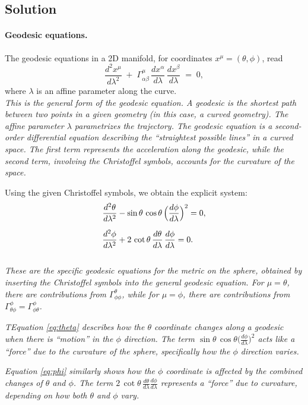 \documentclass{article}
\begin{document}
\subsection*{Solution}

\paragraph{Geodesic equations.}
The geodesic equations in a 2D manifold, for coordinates \(x^\mu=(\theta,\phi)\), read
\[
\frac{d^2 x^\mu}{d\lambda^2}
\;+\;
\Gamma_{\alpha\beta}^\mu \,\frac{dx^\alpha}{d\lambda}\,\frac{dx^\beta}{d\lambda}
\;=\; 0,
\]
where \(\lambda\) is an affine parameter along the curve.\\
\emph{This is the general form of the geodesic equation. A geodesic is the shortest path between two points in a given geometry (in this case, a curved geometry). The affine parameter \(\lambda\) parametrizes the trajectory. The geodesic equation is a second-order differential equation describing the ``straightest possible lines'' in a curved space. The first term represents the acceleration along the geodesic, while the second term, involving the Christoffel symbols, accounts for the curvature of the space.}

Using the given Christoffel symbols, we obtain the explicit system:
\begin{align}
\frac{d^2 \theta}{d\lambda^2}
&-\sin\theta \,\cos\theta \,\Bigl(\frac{d\phi}{d\lambda}\Bigr)^2
= 0,
\label{eq:theta}\\[6pt]
\frac{d^2 \phi}{d\lambda^2}
&+ 2 \,\cot\theta\,\frac{d\theta}{d\lambda}\,\frac{d\phi}{d\lambda}
= 0.
\label{eq:phi}
\end{align}
\\
\emph{These are the specific geodesic equations for the metric on the sphere, obtained by inserting the Christoffel symbols into the general geodesic equation. For \(\mu = \theta\), there are contributions from \(\Gamma^{\theta}_{\phi\phi}\), while for \(\mu = \phi\), there are contributions from \(\Gamma^{\phi}_{\theta\phi} = \Gamma^{\phi}_{\phi\theta}\).}

\emph{TEquation \eqref{eq:theta} describes how the \(\theta\) coordinate changes along a geodesic when there is ``motion'' in the \(\phi\) direction. The term \(\sin\theta\,\cos\theta \bigl(\tfrac{d\phi}{d\lambda}\bigr)^2\) acts like a ``force'' due to the curvature of the sphere, specifically how the \(\phi\) direction varies.}

\emph{Equation \eqref{eq:phi} similarly shows how the \(\phi\) coordinate is affected by the combined changes of \(\theta\) and \(\phi\). The term \(2 \,\cot\theta\, \tfrac{d\theta}{d\lambda} \tfrac{d\phi}{d\lambda}\) represents a ``force'' due to curvature, depending on how both \(\theta\) and \(\phi\) vary.}
\end{document}
